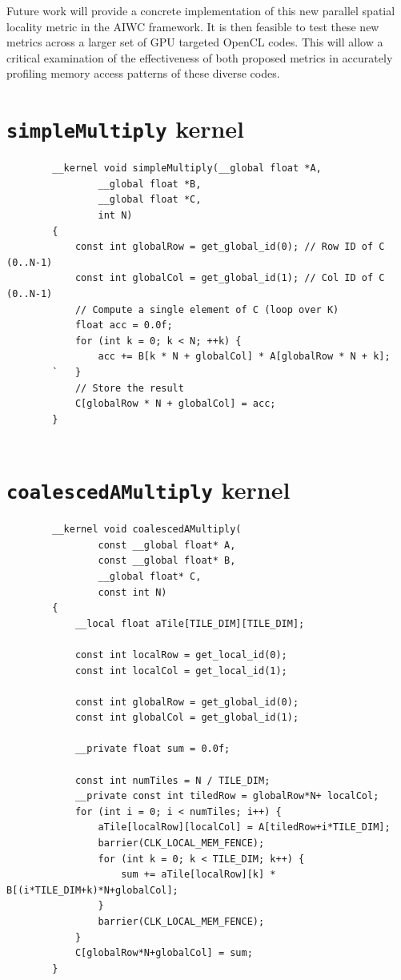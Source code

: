\documentclass[review=false, sigchi]{acmart}
\begin{document}
	Future work will provide a concrete implementation of this new parallel spatial locality metric in the AIWC framework. It is then feasible to test these new metrics across a larger set of GPU targeted OpenCL codes. This will allow a critical examination of the effectiveness of both proposed metrics in accurately profiling memory access patterns of these diverse codes.

	
	
	
	\begin{appendix}
		
		\section{\texttt{simpleMultiply} kernel} \label{simpleMultiply}
		
		\begin{lstlisting}
		__kernel void simpleMultiply(__global float *A,
				__global float *B, 
				__global float *C, 
				int N)
		{
			const int globalRow = get_global_id(0); // Row ID of C (0..N-1)
			const int globalCol = get_global_id(1); // Col ID of C (0..N-1)
			// Compute a single element of C (loop over K)
			float acc = 0.0f;
			for (int k = 0; k < N; ++k) {
				acc += B[k * N + globalCol] * A[globalRow * N + k];
		`	}
			// Store the result
			C[globalRow * N + globalCol] = acc;
		}
		
		\end{lstlisting}
		
		\section{\texttt{coalescedAMultiply} kernel} \label{coalescedAMultiply}

			
		\begin{lstlisting}
		__kernel void coalescedAMultiply(
				const __global float* A,
				const __global float* B,
				__global float* C,
				const int N)
		{
			__local float aTile[TILE_DIM][TILE_DIM];
			
			const int localRow = get_local_id(0);
			const int localCol = get_local_id(1);
			
			const int globalRow = get_global_id(0);
			const int globalCol = get_global_id(1);
			
			__private float sum = 0.0f;
			
			const int numTiles = N / TILE_DIM;
			__private const int tiledRow = globalRow*N+ localCol;
			for (int i = 0; i < numTiles; i++) {
				aTile[localRow][localCol] = A[tiledRow+i*TILE_DIM];
				barrier(CLK_LOCAL_MEM_FENCE);
				for (int k = 0; k < TILE_DIM; k++) {
					sum += aTile[localRow][k] * B[(i*TILE_DIM+k)*N+globalCol];
				}
				barrier(CLK_LOCAL_MEM_FENCE);
			}
			C[globalRow*N+globalCol] = sum;
		}
		\end{lstlisting}


\end{appendix}
\end{document}
